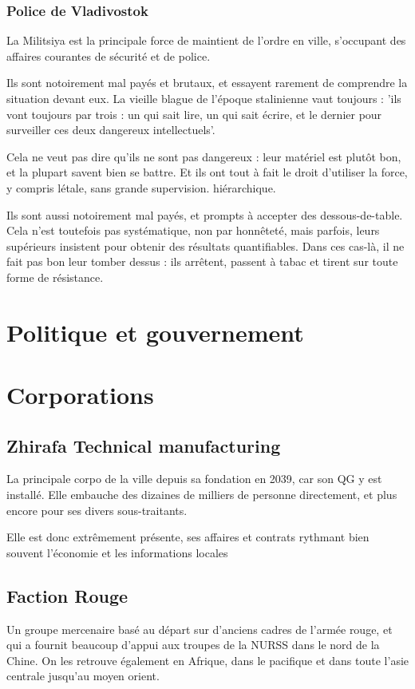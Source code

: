\documentclass[10pt,a4paper]{book}
\begin{document}
\subsection{Police de Vladivostok}
La Militsiya est la principale force de maintient de l'ordre en ville, s'occupant des affaires courantes de sécurité et de police.

Ils sont notoirement mal payés et brutaux, et essayent rarement de comprendre la situation devant eux. La vieille blague de l'époque stalinienne vaut toujours : 'ils vont toujours par trois : un qui sait lire, un qui sait écrire, et le dernier pour surveiller ces deux dangereux intellectuels'.

Cela ne veut pas dire qu'ils ne sont pas dangereux : leur matériel est plutôt bon, et la plupart savent bien se battre. Et ils ont tout à fait le droit d'utiliser la force, y compris létale, sans grande supervision.
 hiérarchique.
 
Ils sont aussi notoirement mal payés, et prompts à accepter des dessous-de-table. Cela n'est toutefois pas systématique, non par honnêteté, mais parfois, leurs supérieurs insistent pour obtenir des résultats quantifiables. Dans ces cas-là, il ne fait pas bon leur tomber dessus : ils arrêtent, passent à tabac et tirent sur toute forme de résistance.
\chapter{Politique et gouvernement}
\chapter{Corporations}
\section{Zhirafa Technical manufacturing}
La principale corpo de la ville depuis sa fondation en 2039, car son QG y est installé. Elle embauche des dizaines de milliers de personne directement, et plus encore pour ses divers sous-traitants.

Elle est donc extrêmement présente, ses affaires et contrats rythmant bien souvent l'économie et les informations locales
\section{Faction Rouge}
Un groupe mercenaire basé au départ sur d'anciens cadres de l'armée rouge, et qui a fournit beaucoup d'appui aux troupes de la NURSS dans le nord de la Chine. On les retrouve également en Afrique, dans le pacifique et dans toute l'asie centrale jusqu'au moyen orient.
\end{document}
